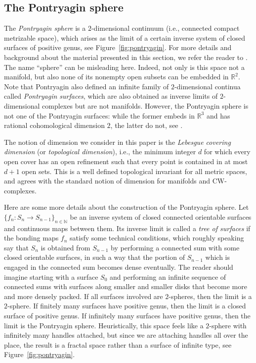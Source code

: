 \documentclass{amsart}
\theoremstyle{plain}
\theoremstyle{definition}
\theoremstyle{remark}
\numberwithin{equation}{section}
\newcommand{\nn}{\mathbb N}
\newcommand{\rr}{\mathbb R}
\begin{document}
\subsection{The Pontryagin sphere}\label{sec:pontryagin}
The \textit{Pontryagin sphere} is a $2$-dimensional continuum (i.e., connected compact metrizable space), which arises as the limit of a certain inverse system of closed surfaces of positive genus, see Figure~\ref{fig:pontryagin}. 
For more details and background about the material presented in this section, we refer the reader to \cite{JA91,FI03,ZA10,SW20,SW20sp}.
The name ``sphere'' can be misleading here. 
Indeed, not only is this space not a manifold, but also none of its nonempty open subsets can be embedded in  $\rr^2$. 
Note that Pontryagin also defined an infinite family of $2$-dimensional continua called \textit{Pontryagin surfaces}, which are also obtained as inverse limits of $2$-dimensional complexes but are not manifolds. 
However, the Pontryagin sphere is not one of the Pontryagin surfaces: while the former embeds in $\rr^3$ and has rational cohomological dimension $2$, the latter do not, see \cite[Example 1.9]{DR05}.


The notion of dimension we consider in this paper is the \textit{Lebesgue covering dimension} (or \textit{topological dimension}), i.e., the minimum integer $d$ for which every open cover has an open refinement such that every point is contained in at most $d+1$ open sets.
This is a well defined topological invariant for all metric spaces, and agrees with the standard notion of dimension for manifolds and CW-complexes.



Here are some more details about the construction of the Pontryagin sphere.
Let $\{f_{n}:S_n\to S_{n-1}\}_{n\in \nn}$ be an inverse system of closed connected  orientable surfaces and continuous maps between them.
Its inverse limit is called a \textit{tree of surfaces} if the bonding maps $f_n$ satisfy some technical conditions, which roughly speaking say that $S_n$ is obtained from $S_{n-1}$ by performing a connected sum with some closed orientable surfaces, in such a way that the portion of $S_{n-1}$ which is engaged in the connected sum becomes dense eventually.
The reader should imagine starting with a surface $S_0$ and performing an infinite sequence of connected sums with surfaces along smaller and smaller disks that become more and more densely packed.
If all surfaces involved are $2$-spheres, then the limit is a $2$-sphere. 
If finitely many surfaces have positive genus, then the limit is a closed surface of positive genus. 
If infinitely many surfaces have positive genus, then the limit is the Pontryagin sphere. Heuristically, this space feels like a $2$-sphere with infinitely many handles attached, but since we are attaching handles all over the place, the result is a fractal space rather than a surface of infinite type, see Figure~\ref{fig:pontryagin}.
\end{document}
